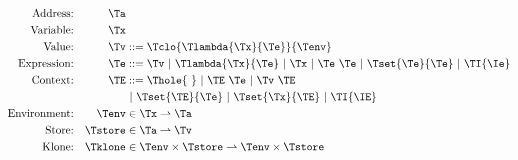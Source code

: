 {\begin{figure}[h]
\begin{align*}
\textrm{Address:}     && \Ta          & \\
\textrm{Variable:}    && \Tx          & \\
\textrm{Value:}       && \Tv          & ::= \Tclo{\Tlambda{\Tx}{\Te}}{\Tenv}\\
\textrm{Expression:}  && \Te          & ::=  \Tv
                                        \ |\ \Tlambda{\Tx}{\Te}
                                        \ |\ \Tx
                                        \ |\ \Te\ \Te
                                        \ |\ \Tset{\Te}{\Te}
                                        \ |\ \TI{\Ie}\\
\textrm{Context:}     && \TE          & ::=  \Thole{\ }
                                        \ |\ \TE\ \Te
                                        \ |\ \Tv\ \TE\\&&&
                                        \ |\ \Tset{\TE}{\Te}
                                        \ |\ \Tset{\Tx}{\TE}
                                        \ |\ \TI{\IE}\\
\textrm{Environment:} && \Tenv        & \in \Tx \rightharpoonup \Ta \\
\textrm{Store:}       && \Tstore      & \in \Ta \rightharpoonup \Tv \\
\textrm{Klone:}       && \Tklone   & \in \Tenv \times \Tstore \rightharpoonup \Tenv \times \Tstore \\
\end{align*}
\end{figure}}
